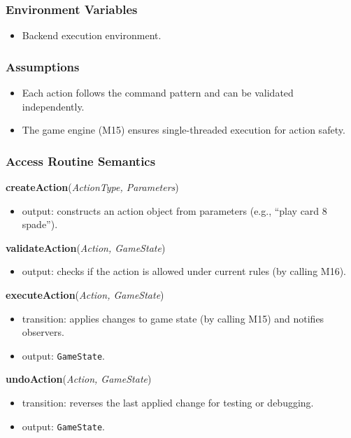 \documentclass[12pt, titlepage]{article}
\begin{document}
\subsubsection{Environment Variables}
\begin{itemize}
    \item Backend execution environment.
\end{itemize}

\subsubsection{Assumptions}
\begin{itemize}
    \item Each action follows the command pattern and can be validated independently.
    \item The game engine (M15) ensures single-threaded execution for action safety.
\end{itemize}

\subsubsection{Access Routine Semantics}
\noindent\textbf{createAction}(\textit{ActionType, Parameters})
\begin{itemize}
    \item output: constructs an action object from parameters (e.g., ``play card 8 spade'').
\end{itemize}

\noindent\textbf{validateAction}(\textit{Action, GameState})
\begin{itemize}
    \item output: checks if the action is allowed under current rules (by calling M16).
\end{itemize}

\noindent\textbf{executeAction}(\textit{Action, GameState})
\begin{itemize}
    \item transition: applies changes to game state (by calling M15) and notifies observers.
    \item output: \texttt{GameState}.
\end{itemize}

\noindent\textbf{undoAction}(\textit{Action, GameState})
\begin{itemize}
    \item transition: reverses the last applied change for testing or debugging.
    \item output: \texttt{GameState}.
\end{itemize}
\end{document}
